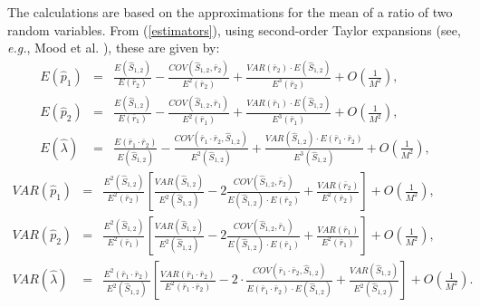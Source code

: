 \documentclass[a4paper,10pt,twoside]{article}
\begin{document}
The calculations are based on the approximations for the mean of a ratio of two random variables. From (\ref{estimators}), using second-order Taylor expansions (see, {\it{e.g.}}, Mood et al. \cite{mood}), these are given by:
\begin{eqnarray*}
E(\hat{p}_1) &=& \frac{E(\hat{S}_{1,2})}{E(\bar{r}_2)} - \frac{COV(\hat{S}_{1,2},\bar{r}_2)}{E^2(\bar{r}_2)} +\frac{VAR(\bar{r}_2) \cdot E(\hat{S}_{1,2})}{E^3(\bar{r}_2)}+ O\left(\frac{1}{M^2}\right), \\
E(\hat{p}_2) &=& \frac{E(\hat{S}_{1,2})}{E(\bar{r}_1)} - \frac{COV(\hat{S}_{1,2},\bar{r}_1)}{E^2(\bar{r}_1)} +\frac{VAR(\bar{r}_1) \cdot E(\hat{S}_{1,2})}{E^3(\bar{r}_1)}+ O\left(\frac{1}{M^2}\right), \\
E(\hat{\lambda})&=& \frac{E(\bar{r}_1 \cdot \bar{r}_2)}{E(\hat{S}_{1,2})}-\frac{COV(\bar{r}_1 \cdot \bar{r}_2,\hat{S}_{1,2})}{E^2(\hat{S}_{1,2})}+\frac{VAR(\hat{S}_{1,2}) \cdot E(\bar{r}_1 \cdot \bar{r}_2)}{E^3(\hat{S}_{1,2})}+ O\left(\frac{1}{M^2}\right),
\end{eqnarray*}
\begin{eqnarray*} 
VAR(\hat{p}_1) &=& \frac{E^2(\hat{S}_{1,2})}{E^2(\bar{r}_2)} \left[\frac{VAR(\hat{S}_{1,2})}{E^2(\hat{S}_{1,2})}-2 \frac{COV(\hat{S}_{1,2},\bar{r}_2)}{E(\hat{S}_{1,2}) \cdot E(\bar{r}_2)} +\frac{VAR(\bar{r}_2)}{E^2(\bar{r}_2)}\right]+O\left(\frac{1}{M^2}\right),\\
VAR(\hat{p}_2) &=& \frac{E^2(\hat{S}_{1,2})}{E^2(\bar{r}_1)} \left[\frac{VAR(\hat{S}_{1,2})}{E^2(\hat{S}_{1,2})}-2 \frac{COV(\hat{S}_{1,2},\bar{r}_1)}{E(\hat{S}_{1,2}) \cdot E(\bar{r}_1)} +\frac{VAR(\bar{r}_1)}{E^2(\bar{r}_1)}\right]+O\left(\frac{1}{M^2}\right), \\
VAR(\hat{\lambda})&=& \frac{E^2(\bar{r}_1 \cdot \bar{r}_2)}{E^2(\hat{S}_{1,2})}\left[\frac{VAR(\bar{r}_1 \cdot \bar{r}_2)}{E^2(\bar{r}_1 \cdot \bar{r}_2)}-2 \cdot \frac{COV(\bar{r}_1 \cdot \bar{r}_2,\hat{S}_{1,2})}{E(\bar{r}_1 \cdot \bar{r}_2) \cdot E(\hat{S}_{1,2})}+\frac{VAR(\hat{S}_{1,2})}{E^2(\hat{S}_{1,2})}\right]+O\left(\frac{1}{M^2}\right).\end{eqnarray*}
\end{document}

